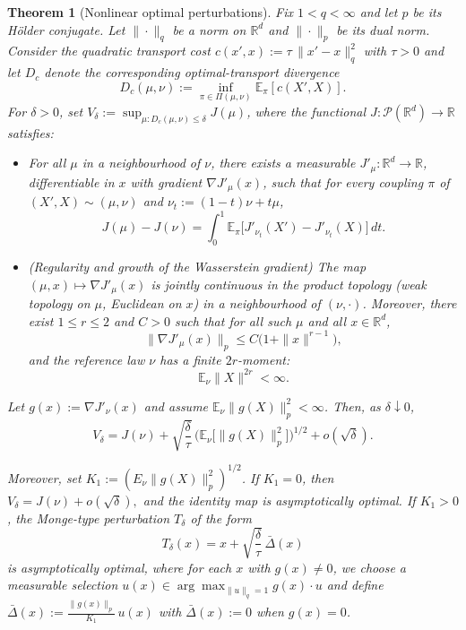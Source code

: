 \documentclass[11pt]{article}
\newtheorem{theorem}{Theorem}
\theoremstyle{definition}
\newcommand{\R}{\mathbb{R}}
\newcommand{\cP}{\mathcal{P}}
\newcommand{\E}{\mathbb{E}}
\begin{document}
    


\begin{theorem}[Nonlinear optimal perturbations]\label{thm:asymptotic_perturbation}
Fix $1<q<\infty$ and let $p$ be its H\"older conjugate.
Let $\|\cdot\|_q$ be a norm on $\R^d$ and $\|\cdot\|_p$ be its dual norm.
Consider the quadratic transport cost $c(x', x) := \tau\,\|x'-x\|_q^2$ with $\tau > 0$
and let $D_c$ denote the corresponding optimal-transport divergence
\[
  D_c(\mu,\nu)
  := \inf_{\pi\in\Pi(\mu,\nu)} \E_\pi\!\left[c(X',X)\right].
\]
For $\delta>0$, set $V_\delta := \sup_{\mu:D_c(\mu,\nu)\le\delta} J(\mu)$, where the functional
$J:\cP(\R^d)\to\R$ satisfies:

\begin{itemize}
  \item[(i)]
  For all $\mu$ in a neighbourhood of $\nu$, there exists a measurable
  $J'_\mu:\R^d\to\R$, differentiable in $x$ with gradient $\nabla J'_\mu(x)$,
  such that for every coupling $\pi$ of $(X',X)\sim(\mu,\nu)$ and
  $\nu_t := (1-t)\nu + t\mu$,
  \[
    J(\mu) - J(\nu)
    = \int_0^1 \E_\pi\big[ J'_{\nu_t}(X') - J'_{\nu_t}(X) \big]\,dt.
  \]

  \item[(ii)]
  (Regularity and growth of the Wasserstein gradient)
  The map $(\mu,x)\mapsto \nabla J'_\mu(x)$ is jointly continuous in the product
  topology (weak topology on $\mu$, Euclidean on $x$) in a neighbourhood
  of $(\nu,\cdot)$.
  Moreover, there exist $1\le r\le 2$ and $C>0$ such that for all such $\mu$ and all $x\in\R^d$,
  \[
    \|\nabla J'_\mu(x)\|_p \le C\big(1+\|x\|^{r-1}\big),
  \]
  and the reference law $\nu$ has a finite $2r$-moment:
  \[
    \E_\nu\|X\|^{2r} < \infty.
  \]
\end{itemize}

Let $g(x) := \nabla J'_\nu(x)$ and assume
$\E_\nu\|g(X)\|_p^2<\infty$.
Then, as $\delta\downarrow 0$,
\[
  V_\delta
  = J(\nu)
    + \sqrt{\frac{\delta}{\tau}}\,
      \Big( \E_\nu\big[\|g(X)\|_p^2\big] \Big)^{1/2}
    + o(\sqrt{\delta}).
\]
{
Moreover, set $
K_1:=\left(E_\nu\|g(X)\|_p^2\right)^{1/2}$. 
If \(K_1=0\), then
$
V_\delta=J(\nu)+o(\sqrt{\delta}),
$ 
and the identity map is asymptotically optimal. 
If \(K_1>0\), 
the Monge-type perturbation $T_\delta$ of the form
\[
    T_\delta(x)
  = x + \sqrt{\frac{\delta}{\tau}}\,
      \bar{\Delta}(x)
\]
is asymptotically optimal, where for each $x$ with $g(x)\neq 0$, we choose a measurable selection 
$u(x) \in \arg\max_{\|u\|_q=1} g(x)\cdot u$ and define $\bar{\Delta}(x) := \frac{\|g(x)\|_p}{K_1}\,u(x)$ with $\bar{\Delta}(x):=0$ when $g(x)=0$. 

}
\end{theorem}
\end{document}
